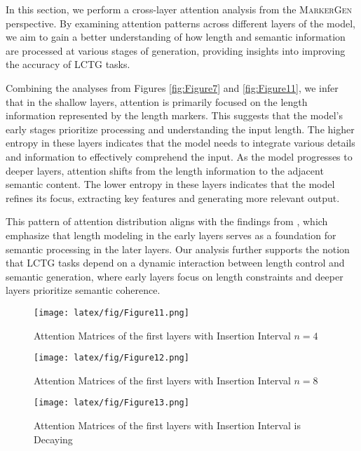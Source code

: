 In this section, we perform a cross-layer attention analysis from the \textsc{MarkerGen} perspective. By examining attention patterns across different layers of the model, we aim to gain a better understanding of how length and semantic information are processed at various stages of generation, providing insights into improving the accuracy of LCTG tasks.

Combining the analyses from Figures \ref{fig:Figure7} and \ref{fig:Figure11}, we infer that in the shallow layers, attention is primarily focused on the length information represented by the length markers. This suggests that the model’s early stages prioritize processing and understanding the input length. The higher entropy in these layers indicates that the model needs to integrate various details and information to effectively comprehend the input. As the model progresses to deeper layers, attention shifts from the length information to the adjacent semantic content. The lower entropy in these layers indicates that the model refines its focus, extracting key features and generating more relevant output.

This pattern of attention distribution aligns with the findings from \citep{moonlength}, which emphasize that length modeling in the early layers serves as a foundation for semantic processing in the later layers. Our analysis further supports the notion that LCTG tasks depend on a dynamic interaction between length control and semantic generation, where early layers focus on length constraints and deeper layers prioritize semantic coherence.





\begin{figure*}[t]
\centering
  \texttt{[image: latex/fig/Figure11.png]}
  \caption{Attention Matrices of the first layers with Insertion Interval \( n=4 \)}
  \vspace{-0.5cm} %
  \label{fig:Figure12}
\end{figure*}

\begin{figure*}[t]
\centering
  \texttt{[image: latex/fig/Figure12.png]}
  \caption{Attention Matrices of the first layers with Insertion Interval \( n=8 \)}
  \vspace{-0.5cm} %
  \label{fig:Figure13}
\end{figure*}

\begin{figure*}[t]
\centering
  \texttt{[image: latex/fig/Figure13.png]}
  \caption{Attention Matrices of the first layers with Insertion Interval is Decaying}
  \vspace{-0.5cm} %
  \label{fig:Figure14}
\end{figure*}